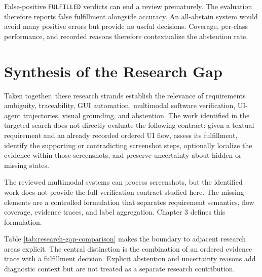 False-positive \texttt{FULFILLED} verdicts can end a review prematurely. The evaluation
therefore reports false fulfillment alongside accuracy. An all-abstain system
would avoid many positive errors but provide no useful decisions. Coverage,
per-class performance, and recorded reasons therefore contextualize the
abstention rate.

\section{Synthesis of the Research Gap}\label{synthesis-of-the-research-gap}

Taken together, these research strands establish the relevance of requirements ambiguity, traceability,
GUI automation, multimodal software verification, UI-agent trajectories,
visual grounding, and abstention. The work identified in the targeted search
does not directly evaluate the following contract: given a textual requirement and an already recorded ordered
UI flow, assess its fulfillment, identify the supporting or contradicting
screenshot steps, optionally localize the evidence within those screenshots,
and preserve uncertainty about hidden or missing states.

The reviewed multimodal systems can process screenshots, but the identified work does
not provide the full verification contract studied here. The missing elements
are a controlled formulation that separates requirement semantics, flow
coverage, evidence traces, and label aggregation. Chapter 3 defines this
formulation.

Table \ref{tab:research-gap-comparison} makes the boundary to adjacent research
areas explicit. The central distinction is the combination of an ordered
evidence trace with a fulfillment decision. Explicit abstention and uncertainty
reasons add diagnostic context but are not treated as a separate research
contribution.

